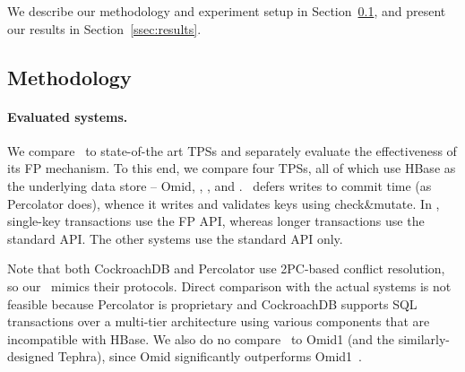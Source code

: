 

We describe our methodology and experiment setup in Section~\ref{ssec:methodology}, and present our results 
in Section~\ref{ssec:results}.

\subsection{Methodology}
\label{ssec:methodology}

\paragraph{Evaluated systems.}

We compare \sys\  to  state-of-the art TPSs and separately evaluate the effectiveness of its FP mechanism.
To this end, we compare four TPSs, all of which use HBase as the underlying data store -- Omid, \sysll, 
\syspc, and \sys. \syspc\ defers writes to commit time (as Percolator does), whence it writes and validates
keys using check\&mutate.
In \sys, single-key transactions use the FP API, whereas longer transactions use the standard API. 
The other systems use the standard API only.

Note that both CockroachDB and Percolator use 2PC-based conflict resolution, so our \syspc\ mimics
their protocols. 
Direct comparison with the actual systems is not feasible because Percolator is proprietary and 
CockroachDB supports SQL transactions over a multi-tier
architecture using various components that are incompatible with HBase. 
We also do no compare \sys\ to Omid1 (and the similarly-designed Tephra), since Omid significantly
outperforms Omid1~\cite{Omid2017}.

